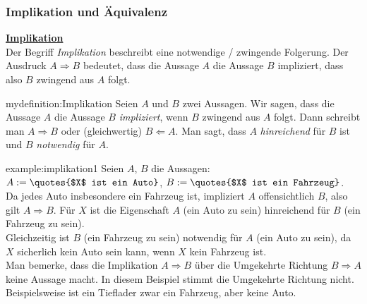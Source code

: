 \subsubsection{Implikation und Äquivalenz}
\textbf{\underline{Implikation}}\\
Der Begriff \textit{Implikation} beschreibt eine notwendige / zwingende Folgerung. Der Ausdruck $A \Rightarrow B$ bedeutet, dass die Aussage $A$ die Aussage $B$ impliziert, dass also $B$ zwingend aus $A$ folgt.
\begin{mydefinition}[Implikation]{mydefinition:Implikation}
Seien $A$ und $B$ zwei Aussagen. Wir sagen, dass die Aussage $A$ die Aussage $B$ \textit{impliziert}, wenn $B$ zwingend aus $A$ folgt. Dann schreibt man $A \Rightarrow B$ oder (gleichwertig) $B \Leftarrow A$. Man sagt, dass $A$ \textit{hinreichend} für $B$ ist und $B$ \textit{notwendig} für $A$.\\
\end{mydefinition}

\begin{example}{example:implikation1}
	Seien $A$, $B$ die Aussagen:\\
	$A := \text{\quotes{$X$ ist ein Auto}}$, $B := \text{\quotes{$X$ ist ein Fahrzeug}}$.\\
	Da jedes Auto insbesondere ein Fahrzeug ist, impliziert $A$ offensichtlich $B$, also gilt $A \Rightarrow B$. Für $X$ ist die Eigenschaft $A$ (ein Auto zu sein) hinreichend für $B$ (ein Fahrzeug zu sein).\\
	Gleichzeitig ist $B$ (ein Fahrzeug zu sein) notwendig für $A$ (ein Auto zu sein), da $X$ sicherlich kein Auto sein kann, wenn $X$ kein Fahrzeug ist.\\
	Man bemerke, dass die Implikation $A \Rightarrow B$ über die Umgekehrte Richtung $B \Rightarrow A$ keine Aussage macht. In diesem Beispiel stimmt die Umgekehrte Richtung nicht. Beispielsweise ist ein Tieflader zwar ein Fahrzeug, aber keine Auto.\\
\end{example}

